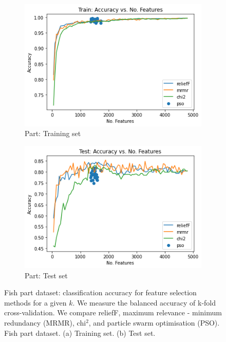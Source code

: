 \documentclass[runningheads]{llncs}
\begin{document}
\begin{figure}[htb]
  \centering
  \begin{subfigure}[b]{.55\linewidth}
    \includegraphics[width=\linewidth]{accuracy-features-part-train.png}
    \caption{Part: Training set}\label{fig:accuracy-features-part-train}
  \end{subfigure}
  \begin{subfigure}[b]{.55\linewidth}
    \includegraphics[width=\linewidth]{accuracy-features-part-test.png}
    \caption{Part: Test set}\label{fig:accuracy-features-part-test}
  \end{subfigure}
  \caption[Two numerical solutions]{
    Fish part dataset: classification accuracy for feature selection methods for a given $k$.
    We measure the balanced accuracy of k-fold cross-validation.
    We compare reliefF, maximum relevance - minimum redundancy (MRMR), chi$^2$, and particle swarm optimisation (PSO).
    Fish part dataset. (a) Training set. (b) Test set.}
  \label{fig:accuracy-features-part-train}
\end{figure}
\end{document}
